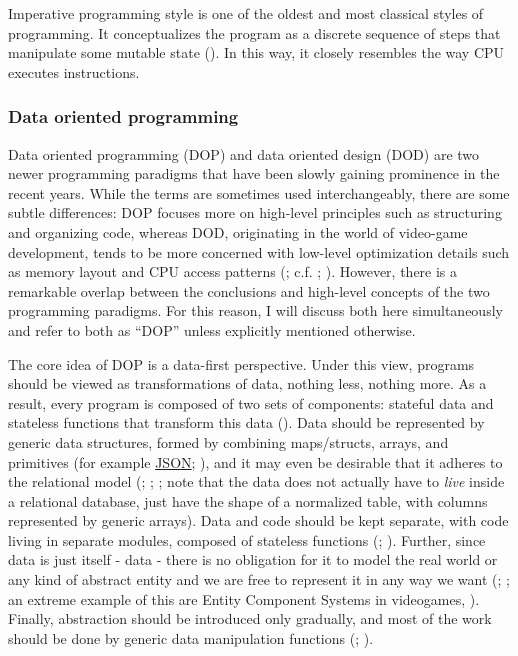 \documentclass[
]{book}
\theoremstyle{definition}
\theoremstyle{definition}
\theoremstyle{definition}
\theoremstyle{definition}
\theoremstyle{remark}
\begin{document}
Imperative programming style is one of the oldest and most classical styles of programming. It conceptualizes the program as a discrete sequence of steps that manipulate some mutable state (). In this way, it closely resembles the way CPU executes instructions.

\subsubsection{Data oriented programming}\label{data-oriented-programming}

Data oriented programming (DOP) and data oriented design (DOD) are two newer programming paradigms that have been slowly gaining prominence in the recent years. While the terms are sometimes used interchangeably, there are some subtle differences: DOP focuses more on high-level principles such as structuring and organizing code, whereas DOD, originating in the world of video-game development, tends to be more concerned with low-level optimization details such as memory layout and CPU access patterns (; c.f. ; ). However, there is a remarkable overlap between the conclusions and high-level concepts of the two programming paradigms. For this reason, I will discuss both here simultaneously and refer to both as ``DOP'' unless explicitly mentioned otherwise.

The core idea of DOP is a data-first perspective. Under this view, programs should be viewed as transformations of data, nothing less, nothing more. As a result, every program is composed of two sets of components: stateful data and stateless functions that transform this data (). Data should be represented by generic data structures, formed by combining maps/structs, arrays, and primitives (for example \hyperref[JSON]{JSON}; ), and it may even be desirable that it adheres to the relational model (; ; ; note that the data does not actually have to \emph{live} inside a relational database, just have the shape of a normalized table, with columns represented by generic arrays). Data and code should be kept separate, with code living in separate modules, composed of stateless functions (; ). Further, since data is just itself - data - there is no obligation for it to model the real world or any kind of abstract entity and we are free to represent it in any way we want (; ; an extreme example of this are Entity Component Systems in videogames, ). Finally, abstraction should be introduced only gradually, and most of the work should be done by generic data manipulation functions (; ).
\end{document}
